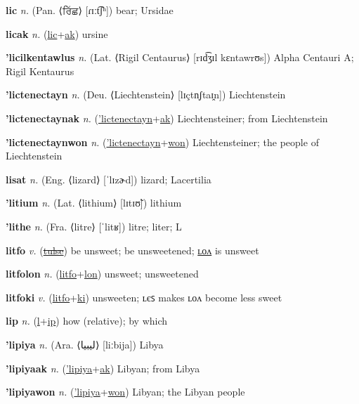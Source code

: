 \textbf{\hypertarget{lic}{lic}} \textit{n.} (Pan. ⟨{\gurmukhi{}ਰਿੱਛ}⟩ [ɾɪːt͡ʃʰ])
bear; Ursidae

\textbf{\hypertarget{licak}{licak}} \textit{n.} (\hyperlink{lic}{lic}+\allowbreak \hyperlink{ak}{ak})
ursine

\textbf{\hypertarget{'licilkentawlus}{'licilkentawlus}} \textit{n.} (Lat. ⟨Rigil Centaurus⟩ [rɪd͡ʒɪl kɛntawrʊs])
Alpha Centauri A; Rigil Kentaurus

\textbf{\hypertarget{'lictenectayn}{'lictenectayn}} \textit{n.} (Deu. ⟨Liechtenstein⟩ [lɪçtn̩ʃtaɪ̯n])
Liechtenstein

\textbf{\hypertarget{'lictenectaynak}{'lictenectaynak}} \textit{n.} (\hyperlink{'lictenectayn}{'lictenectayn}+\allowbreak \hyperlink{ak}{ak})
Liechtensteiner; from Liechtenstein

\textbf{\hypertarget{'lictenectaynwon}{'lictenectaynwon}} \textit{n.} (\hyperlink{'lictenectayn}{'lictenectayn}+\allowbreak \hyperlink{won}{won})
Liechtensteiner; the people of Liechtenstein

\textbf{\hypertarget{lisat}{lisat}} \textit{n.} (Eng. ⟨lizard⟩ [ˈlɪzɚd])
lizard; Lacertilia

\textbf{\hypertarget{'litium}{'litium}} \textit{n.} (Lat. ⟨lithium⟩ [lɪtɪʊ̃])
lithium

\textbf{\hypertarget{'lithe}{'lithe}} \textit{n.} (Fra. ⟨litre⟩ [ˈlitʁ])
litre; liter; L

\textbf{\hypertarget{litfo}{litfo}} \textit{v.} (\hyperlink{tulse}{\sout{tulse}})
be unsweet; be unsweetened; \hyperlink{litfolon}{ʟᴏᴧ} is unsweet

\textbf{\hypertarget{litfolon}{litfolon}} \textit{n.} (\hyperlink{litfo}{litfo}+\allowbreak \hyperlink{lon}{lon})
unsweet; unsweetened

\textbf{\hypertarget{litfoki}{litfoki}} \textit{v.} (\hyperlink{litfo}{litfo}+\allowbreak \hyperlink{ki}{ki})
unsweeten; ʟєꜱ makes ʟᴏᴧ become less sweet

\textbf{\hypertarget{lip}{lip}} \textit{n.} (\hyperlink{l}{l}+\allowbreak \hyperlink{ip}{ip})
how (relative); by which

\textbf{\hypertarget{'lipiya}{'lipiya}} \textit{n.} (Ara. ⟨{\arabics{}ليبيا‎}⟩ [liːbija])
Libya

\textbf{\hypertarget{'lipiyaak}{'lipiyaak}} \textit{n.} (\hyperlink{'lipiya}{'lipiya}+\allowbreak \hyperlink{ak}{ak})
Libyan; from Libya

\textbf{\hypertarget{'lipiyawon}{'lipiyawon}} \textit{n.} (\hyperlink{'lipiya}{'lipiya}+\allowbreak \hyperlink{won}{won})
Libyan; the Libyan people

